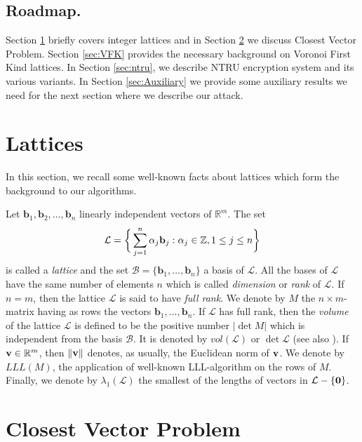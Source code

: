 \documentclass{amsart}
\numberwithin{equation}{section}
\begin{document}
\subsection{Roadmap.}
Section  \ref{sec:lattices} briefly covers integer lattices and in Section \ref{sec:CVP} we discuss Closest Vector Problem. Section \ref{sec:VFK}  provides the necessary background on Voronoi First Kind lattices. In Section \ref{sec:ntru}, we describe NTRU encryption system and its various variants. In Section \ref{sec:Auxiliary} we provide some auxiliary results we need for the next section where we describe our attack. 

\section{Lattices}\label{sec:lattices}

In this section, we recall some well-known facts about lattices which form the 
background to our algorithms.

Let ${{\textbf{b}}_1,{\textbf{b}}_2,\ldots,{\textbf{b}}_n}$ linearly independent vectors of 
${\mathbb{R}}^{m}$.
The set 
\[\mathcal{L} = \bigg{\{} \sum_{j=1}^{n}\alpha_j{\textbf{b}}_j :
 \alpha_j\in\mathbb{Z}, 1\leq j\leq n\bigg{\}}\]
is called  a {\em lattice} and 
the set $\mathcal{B} = \{{\textbf{b}}_1,\ldots,{\textbf{b}}_n\}$ a basis of 
$\mathcal{L}$. 
All the bases of $\mathcal{L}$ have the same number of elements $n$ which is  called
 {\em dimension} or {\em rank} of $\mathcal{L}$. If $n=m$, then
the lattice $\mathcal{L}$ is said to have {\em full rank}. 
We denote by $M$ the $n\times m$-matrix  having as rows the vectors 
${\textbf{b}}_1,\ldots,{\textbf{b}}_n$. 
If $\mathcal{L}$ has full rank, then the {\em volume} of the lattice
 $\mathcal{L}$ is defined to be the positive number
 $|\det{M}|$ which is independent from the basis $\mathcal{B}$. It is denoted 
 by $vol(\mathcal{L})$ or $\det{\mathcal{L}}$ (see also \cite{gal}).
 If ${\textbf v}\in \mathbb{R}^m$, then $\|{\textbf v}\|$ denotes, as usually, the
 Euclidean norm of ${\textbf v}$. 
 We denote by $LLL(M)$, the application of well-known LLL-algorithm on the rows of $M$.
 Finally,   we denote by 
$\lambda_1(\mathcal{L})$ the smallest of the lengths of vectors in 
$ \mathcal{L}-\{ \textbf 0\}$.

\section{Closest Vector Problem}\label{sec:CVP}
\end{document}

